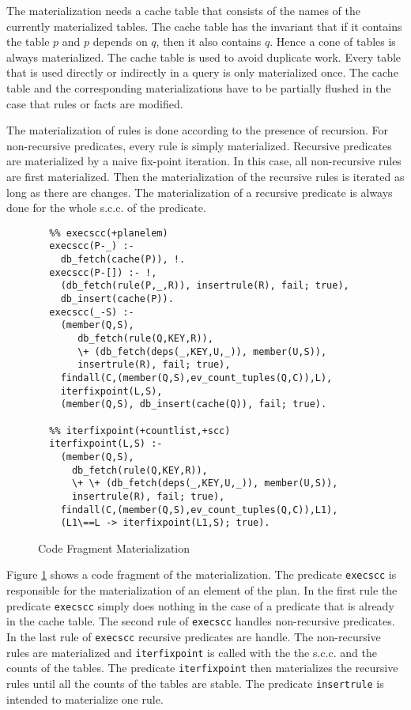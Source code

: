 The materialization needs a cache table that consists of the names of the currently materialized 
tables. The cache table has the invariant that if it contains the table $p$ and $p$ depends 
on $q$, then it also contains $q$. Hence a cone of tables is always materialized. The cache 
table is used to avoid duplicate work. Every table that is used directly or indirectly in a 
query is only materialized once. The cache table and the corresponding materializations have
to be partially flushed in the case that rules or facts are modified.

The materialization of rules is done according to the presence of recursion. For non-recursive 
predicates, every rule is  simply materialized. Recursive predicates are materialized by a naive 
fix-point iteration. In this case, all non-recursive rules are first materialized. Then the 
materialization of the recursive rules is iterated as long as there are changes. The
materialization of a recursive predicate is always done for the whole s.c.c. of the 
predicate.

\begin{figure}
{\small
\begin{verbatim}
  %% execscc(+planelem)
  execscc(P-_) :-
    db_fetch(cache(P)), !.
  execscc(P-[]) :- !,
    (db_fetch(rule(P,_,R)), insertrule(R), fail; true),
    db_insert(cache(P)).
  execscc(_-S) :-
    (member(Q,S),
       db_fetch(rule(Q,KEY,R)),
       \+ (db_fetch(deps(_,KEY,U,_)), member(U,S)),
       insertrule(R), fail; true),
    findall(C,(member(Q,S),ev_count_tuples(Q,C)),L),
    iterfixpoint(L,S),
    (member(Q,S), db_insert(cache(Q)), fail; true).

  %% iterfixpoint(+countlist,+scc)
  iterfixpoint(L,S) :-
    (member(Q,S),
      db_fetch(rule(Q,KEY,R)),
      \+ \+ (db_fetch(deps(_,KEY,U,_)), member(U,S)),
      insertrule(R), fail; true),
    findall(C,(member(Q,S),ev_count_tuples(Q,C)),L1),
    (L1\==L -> iterfixpoint(L1,S); true).
\end{verbatim}
}
\caption{Code Fragment Materialization}
\label{figmatr}
\end{figure}

Figure \ref{figmatr} shows a code fragment of the materialization. The predicate \verb.execscc.
is responsible for the materialization of an element of the plan. In the first rule the predicate
\verb.execscc. simply does nothing in the case of a predicate that is already in the cache
table. The second rule of \verb.execscc. handles non-recursive predicates. In the last rule of 
\verb.execscc. recursive predicates are handle. The non-recursive rules are materialized and 
\verb.iterfixpoint. is called with the the s.c.c. and the counts of the tables. The predicate 
\verb.iterfixpoint. then materializes the recursive rules until all the counts of the tables 
are stable. The predicate \verb.insertrule. is intended to materialize one rule.

